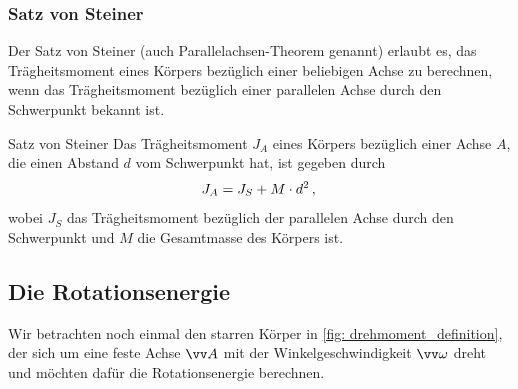 \subsubsection{Satz von Steiner}\label{subsubsec: steiner_satz}
Der Satz von Steiner (auch Parallelachsen-Theorem genannt) erlaubt es, das Trägheitsmoment eines Körpers bezüglich einer beliebigen Achse zu berechnen, wenn das Trägheitsmoment bezüglich einer parallelen Achse durch den Schwerpunkt bekannt ist.
\begin{importantbox}{Satz von Steiner}
    Das Trägheitsmoment $J_A$ eines Körpers bezüglich einer Achse $A$, die einen Abstand $d$ vom Schwerpunkt hat, ist gegeben durch
    \begin{equation}\label{eq: steiner_satz}
        J_A = J_{S} + M \cdot d^2 \,{,}\,
    \end{equation}
    wobei $J_{S}$ das Trägheitsmoment bezüglich der parallelen Achse durch den Schwerpunkt und $M$ die Gesamtmasse des Körpers ist.
\end{importantbox}



\subsection{Die Rotationsenergie}\label{subsec: rotationsenergie_herleitung}
Wir betrachten noch einmal den starren Körper in \cref{fig: drehmoment_definition}, der sich um eine feste Achse $\ivec{A}$ mit der Winkelgeschwindigkeit $\ivec{\omega}$ dreht und möchten dafür die Rotationsenergie berechnen. 

